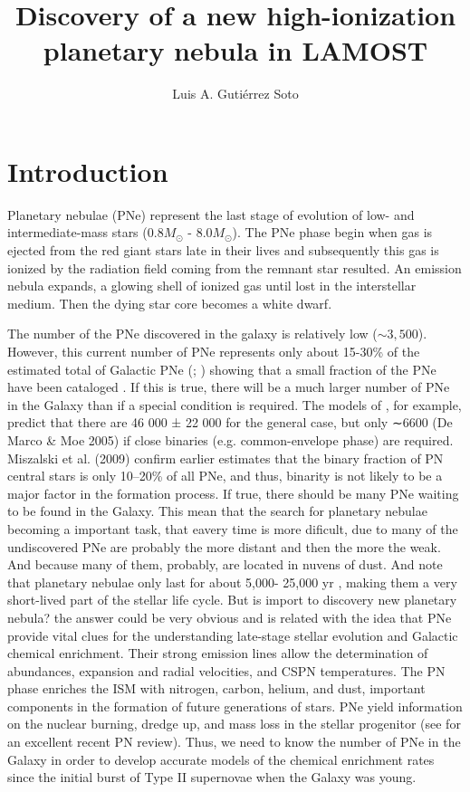 \documentclass[twocolumn]{article}
\title{Discovery of a new high-ionization planetary nebula in LAMOST}
\author{Luis A. Gutiérrez Soto     
}
\newcommand\msol{M_\odot}
\begin{document}
\maketitle

\section{Introduction}
\label{sec:intro}

Planetary nebulae (PNe) represent the last stage of evolution of low- and intermediate-mass stars
(0.8$\msol$ - 8.0$\msol$). The PNe phase begin when gas is ejected from the red giant stars late
in their lives and subsequently this gas is ionized by the radiation field coming from the remnant
star resulted. An emission nebula expands, a glowing shell of ionized gas until lost in the
interstellar medium. Then the dying star core becomes a white dwarf.

The number of the PNe discovered in the galaxy is relatively low (\(\sim 3,500\)). However,
this current number of PNe represents only about 15-30\% of the estimated
total of Galactic PNe (\citealp{Frew:2008}; \citealp{Jacoby:2010}) showing that a small fraction
of the PNe have been cataloged \citep{Frew:2017}. If this is true, there will be a much larger
number of PNe in the Galaxy than if a special condition
is required. The models of \citet{Moe:2006}, for
example, predict that there are 46 000 ± 22 000 for the general case,
but only ∼6600 (De Marco & Moe 2005) if
close binaries (e.g. common-envelope phase) are required.
Miszalski et al. (2009) confirm earlier estimates that the
binary fraction of PN central stars is only 10–20\% of all
PNe, and thus, binarity is not likely to be a major factor in
the formation process. If true, there should be many PNe
waiting to be found in the Galaxy. This mean that the search for planetary nebulae
becoming a important task, that eavery time is more dificult, due to many of
the undiscovered PNe are probably
the more distant and then the more the weak. And because many of them, probably, are located
in nuvens of dust. And note that planetary nebulae only last for about 5,000-
25,000 yr \citep{Badenes:2015}, making them a very short-lived part of the stellar life cycle.
But is import to discovery new planetary nebula? the answer could be very obvious and is
related with the idea that PNe provide vital clues for the understanding late-stage stellar
evolution and Galactic chemical enrichment. Their strong emission lines allow the determination
of abundances, expansion and radial velocities, and
CSPN temperatures. The PN phase
enriches the ISM with nitrogen, carbon, helium, and dust,
important components in the formation of future generations
of stars. PNe yield information on the nuclear
burning, dredge up, and mass loss in the stellar progenitor
(see \citealp{Kwitter:2022} for an excellent recent PN
review). Thus, we need to know the number of PNe in
the Galaxy in order to develop accurate models of the
chemical enrichment rates since the initial burst of Type II
supernovae when the Galaxy was young.
\end{document}
